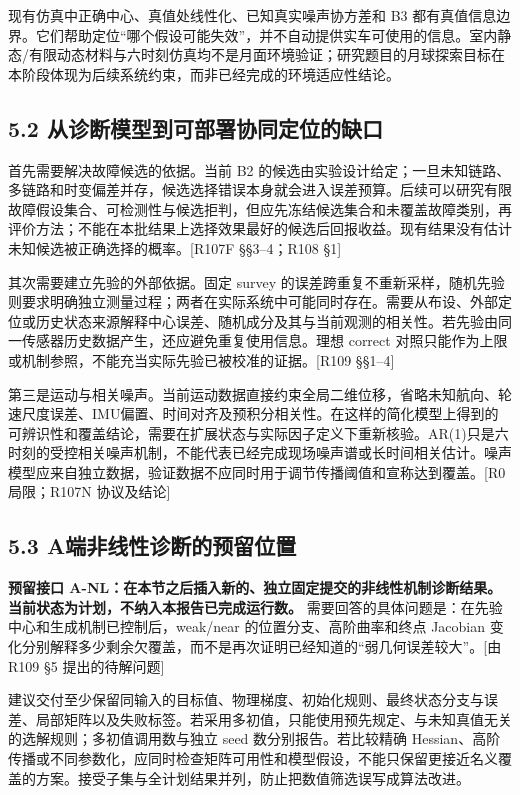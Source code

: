 \documentclass[12pt,a4paper]{article}
\begin{document}
现有仿真中正确中心、真值处线性化、已知真实噪声协方差和 B3
都有真值信息边界。它们帮助定位``哪个假设可能失效''，并不自动提供实车可使用的信息。室内静态/有限动态材料与六时刻仿真均不是月面环境验证；研究题目的月球探索目标在本阶段体现为后续系统约束，而非已经完成的环境适应性结论。

\subsection{5.2
从诊断模型到可部署协同定位的缺口}\label{ux4eceux8bcaux65adux6a21ux578bux5230ux53efux90e8ux7f72ux534fux540cux5b9aux4f4dux7684ux7f3aux53e3}

首先需要解决故障候选的依据。当前 B2
的候选由实验设计给定；一旦未知链路、多链路和时变偏差并存，候选选择错误本身就会进入误差预算。后续可以研究有限故障假设集合、可检测性与候选拒判，但应先冻结候选集合和未覆盖故障类别，再评价方法；不能在本批结果上选择效果最好的候选后回报收益。现有结果没有估计未知候选被正确选择的概率。{[}R107F
§§3--4；R108 §1{]}

其次需要建立先验的外部依据。固定 survey
的误差跨重复不重新采样，随机先验则要求明确独立测量过程；两者在实际系统中可能同时存在。需要从布设、外部定位或历史状态来源解释中心误差、随机成分及其与当前观测的相关性。若先验由同一传感器历史数据产生，还应避免重复使用信息。理想
correct
对照只能作为上限或机制参照，不能充当实际先验已被校准的证据。{[}R109
§§1--4{]}

第三是运动与相关噪声。当前运动数据直接约束全局二维位移，省略未知航向、轮速尺度误差、IMU偏置、时间对齐及预积分相关性。在这样的简化模型上得到的可辨识性和覆盖结论，需要在扩展状态与实际因子定义下重新核验。AR(1)只是六时刻的受控相关噪声机制，不能代表已经完成现场噪声谱或长时间相关估计。噪声模型应来自独立数据，验证数据不应同时用于调节传播阈值和宣称达到覆盖。{[}R0
局限；R107N 协议及结论{]}

\subsection{5.3
A端非线性诊断的预留位置}\label{aux7aefux975eux7ebfux6027ux8bcaux65adux7684ux9884ux7559ux4f4dux7f6e}

\textbf{预留接口
A-NL：在本节之后插入新的、独立固定提交的非线性机制诊断结果。当前状态为计划，不纳入本报告已完成运行数。}
需要回答的具体问题是：在先验中心和生成机制已控制后，weak/near
的位置分支、高阶曲率和终点 Jacobian
变化分别解释多少剩余欠覆盖，而不是再次证明已经知道的``弱几何误差较大''。{[}由
R109 §5 提出的待解问题{]}

建议交付至少保留同输入的目标值、物理梯度、初始化规则、最终状态分支与误差、局部矩阵以及失败标签。若采用多初值，只能使用预先规定、与未知真值无关的选解规则；多初值调用数与独立
seed 数分别报告。若比较精确
Hessian、高阶传播或不同参数化，应同时检查矩阵可用性和模型假设，不能只保留更接近名义覆盖的方案。接受子集与全计划结果并列，防止把数值筛选误写成算法改进。
\end{document}
